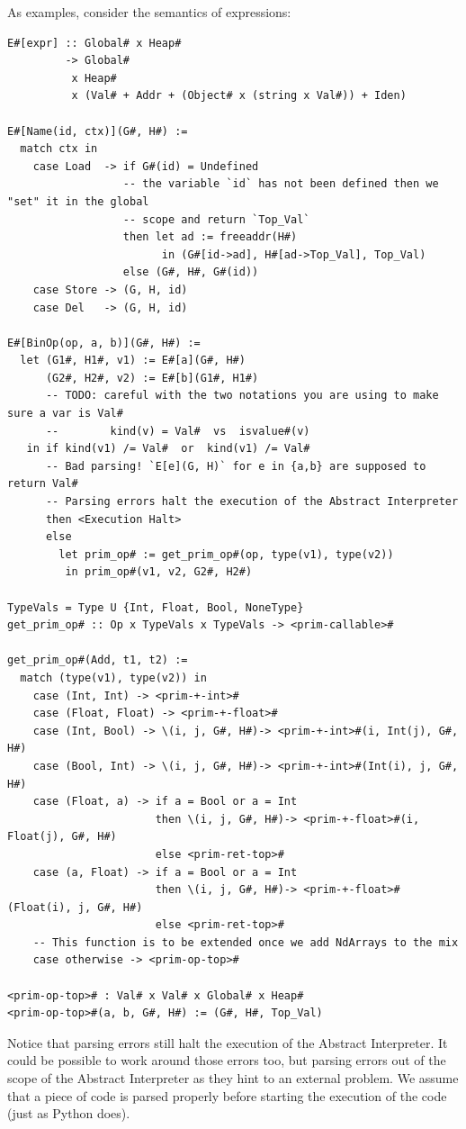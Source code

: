 \documentclass[
11pt, %
english, %
singlespacing, %
headsepline, %
]{MastersDoctoralThesis} %
\begin{document}
As examples, consider the semantics of expressions:

\begin{verbatim}
E#[expr] :: Global# x Heap#
         -> Global#
          x Heap#
          x (Val# + Addr + (Object# x (string x Val#)) + Iden)

E#[Name(id, ctx)](G#, H#) :=
  match ctx in
    case Load  -> if G#(id) = Undefined
                  -- the variable `id` has not been defined then we "set" it in the global
                  -- scope and return `Top_Val`
                  then let ad := freeaddr(H#)
                        in (G#[id->ad], H#[ad->Top_Val], Top_Val)
                  else (G#, H#, G#(id))
    case Store -> (G, H, id)
    case Del   -> (G, H, id)

E#[BinOp(op, a, b)](G#, H#) :=
  let (G1#, H1#, v1) := E#[a](G#, H#)
      (G2#, H2#, v2) := E#[b](G1#, H1#)
      -- TODO: careful with the two notations you are using to make sure a var is Val#
      --        kind(v) = Val#  vs  isvalue#(v)
   in if kind(v1) /= Val#  or  kind(v1) /= Val#
      -- Bad parsing! `E[e](G, H)` for e in {a,b} are supposed to return Val#
      -- Parsing errors halt the execution of the Abstract Interpreter
      then <Execution Halt>
      else
        let prim_op# := get_prim_op#(op, type(v1), type(v2))
         in prim_op#(v1, v2, G2#, H2#)

TypeVals = Type U {Int, Float, Bool, NoneType}
get_prim_op# :: Op x TypeVals x TypeVals -> <prim-callable>#

get_prim_op#(Add, t1, t2) :=
  match (type(v1), type(v2)) in
    case (Int, Int) -> <prim-+-int>#
    case (Float, Float) -> <prim-+-float>#
    case (Int, Bool) -> \(i, j, G#, H#)-> <prim-+-int>#(i, Int(j), G#, H#)
    case (Bool, Int) -> \(i, j, G#, H#)-> <prim-+-int>#(Int(i), j, G#, H#)
    case (Float, a) -> if a = Bool or a = Int
                       then \(i, j, G#, H#)-> <prim-+-float>#(i, Float(j), G#, H#)
                       else <prim-ret-top>#
    case (a, Float) -> if a = Bool or a = Int
                       then \(i, j, G#, H#)-> <prim-+-float>#(Float(i), j, G#, H#)
                       else <prim-ret-top>#
    -- This function is to be extended once we add NdArrays to the mix
    case otherwise -> <prim-op-top>#

<prim-op-top># : Val# x Val# x Global# x Heap#
<prim-op-top>#(a, b, G#, H#) := (G#, H#, Top_Val)
\end{verbatim}

Notice that parsing errors still halt the execution of the Abstract
Interpreter. It could be possible to work around those errors too, but
parsing errors out of the scope of the Abstract Interpreter as they hint
to an external problem. We assume that a piece of code is parsed
properly before starting the execution of the code (just as Python
does).
\end{document}
